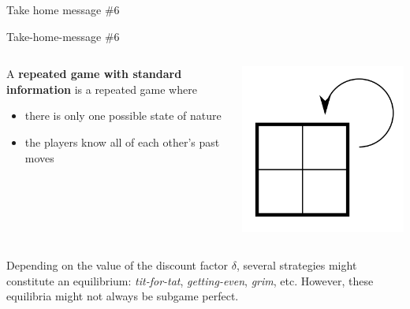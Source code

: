 \begin{frame}{Take home message \#6}

    \begin{block}{Take-home-message \#6}
        \vspace{0.2cm}
        \begin{columns}
            \begin{column}{0.65\textwidth}
                A \textbf{repeated game with standard information} is a repeated game where
                \begin{itemize}
                    \item there is {\color{green}only one possible state of nature}
                    \item the players {\color{green}know all of each other's past moves}
                \end{itemize}
            \end{column}
            \begin{column}{0.2\textwidth}
                \begin{center}
                    \includegraphics[width=0.7\linewidth]{img/std.png}
                \end{center}
            \end{column}
        \end{columns}

        \vspace{0.5cm}
        Depending on the value of the discount factor $\delta$, several strategies might constitute
        an equilibrium: \textit{tit-for-tat}, \textit{getting-even}, \textit{grim}, etc.
        However, these equilibria might not always be subgame perfect.
    \end{block}
\end{frame}
